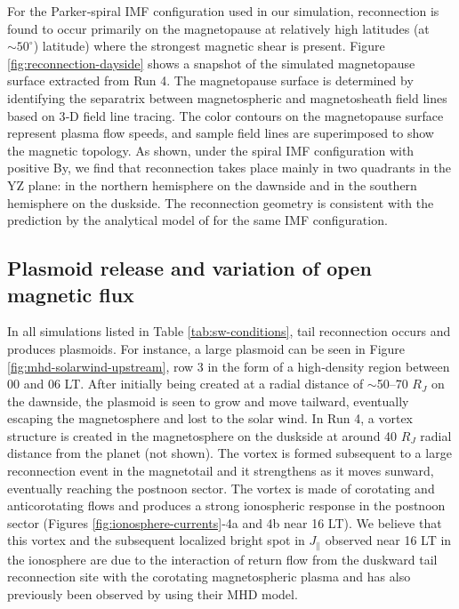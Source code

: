 For the Parker‐spiral IMF configuration used in our simulation, reconnection is found to occur primarily on the magnetopause at relatively high latitudes (at $\sim50^\circ$) latitude) where the strongest magnetic shear is present. Figure \ref{fig:reconnection-dayside} shows a snapshot of the simulated magnetopause surface extracted from Run 4. The magnetopause surface is determined by identifying the separatrix between magnetospheric and magnetosheath field lines based on 3‐D field line tracing. The color contours on the magnetopause surface represent plasma flow speeds, and sample field lines are superimposed to show the magnetic topology. As shown, under the spiral IMF configuration with positive By, we find that reconnection takes place mainly in two quadrants in the YZ plane: in the northern hemisphere on the dawnside and in the southern hemisphere on the duskside. The reconnection geometry is consistent with the prediction by the analytical model of \cite{Masters2017} for the same IMF configuration.

\subsection{Plasmoid release and variation of open magnetic flux}

In all simulations listed in Table \ref{tab:sw-conditions}, tail reconnection occurs and produces plasmoids. For instance, a large plasmoid can be seen in Figure \ref{fig:mhd-solarwind-upstream}, row 3 in the form of a high‐density region between 00 and 06 LT. After initially being created at a radial distance of $\sim$50–70 $R_J$ on the dawnside, the plasmoid is seen to grow and move tailward, eventually escaping the magnetosphere and lost to the solar wind. In Run 4, a vortex structure is created in the magnetosphere on the duskside at around 40 $R_J$ radial distance from the planet (not shown). The vortex is formed subsequent to a large reconnection event in the magnetotail and it strengthens as it moves sunward, eventually reaching the postnoon sector. The vortex is made of corotating and anticorotating flows and produces a strong ionospheric response in the postnoon sector (Figures \ref{fig:ionosphere-currents}‐4a and 4b near 16 LT). We believe that this vortex and the subsequent localized bright spot in $J_\parallel$ observed near 16 LT in the ionosphere are due to the interaction of return flow from the duskward tail reconnection site with the corotating magnetospheric plasma and has also previously been observed by \cite{Fukazawa2006a} using their MHD model. 

